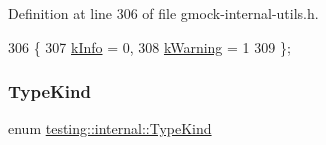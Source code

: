 Definition at line 306 of file gmock-\/internal-\/utils.\+h.


\begin{DoxyCode}
306                  \{
307   \hyperlink{namespacetesting_1_1internal_a203d1a8a2147a53d12bbdae40d443914a396aacfaee2849eaab7c1de9773d624d}{kInfo} = 0,
308   \hyperlink{namespacetesting_1_1internal_a203d1a8a2147a53d12bbdae40d443914a5beeeab1b0a3caabd0afb43356c1a271}{kWarning} = 1
309 \};
\end{DoxyCode}
\mbox{\label{namespacetesting_1_1internal_aa8747bda20137c9aa7f846dee830e686}} 
\subsubsection{\texorpdfstring{Type\+Kind}{TypeKind}}
{\footnotesize\ttfamily enum \hyperlink{namespacetesting_1_1internal_aa8747bda20137c9aa7f846dee830e686}{testing\+::internal\+::\+Type\+Kind}}

